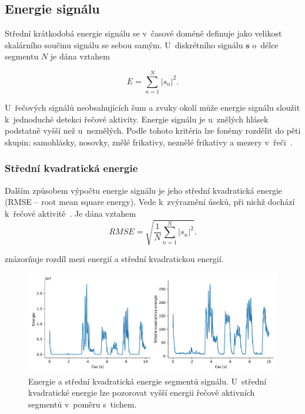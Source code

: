 \subsection{Energie signálu}
\label{subsection:Energy}
Střední krátkodobá energie signálu se v~časové doméně definuje jako velikost skalárního součinu signálu se sebou samým. U~diskrétního signálu $\mathbf{s}$ o~délce segmentu $N$ je dána vztahem

\begin{equation}
\label{eqn:Energy}
    E = \sum_{n=1}^{N} {\lvert s_{n} \rvert}^2.
\end{equation}

U~řečových signálů neobsahujících šum a zvuky okolí může energie signálu sloužit k~jednoduché detekci řečové aktivity. Energie signálu je u~znělých hlásek podstatně vyšší než u~neznělých. Podle tohoto kritéria lze fonémy rozdělit do pěti skupin: samohlásky, nosovky, znělé frikativy, neznělé frikativy a mezery v~řeči~\cite{Sigmund_Analyza}.

\subsubsection{Střední kvadratická energie}
\label{subsection:RMSE}
Dalším způsobem výpočtu energie signálu je jeho střední kvadratická energie (RMSE -- root mean square energy). Vede k~zvýraznění úseků, při nichž dochází k~řečové aktivitě~\cite{Simak_adaptive_energy_VAD}. Je dána vztahem
\begin{equation}
\label{eqn:RMSE}
    RMSE = \sqrt{\frac{1}{N} \sum_{n=1}^{N} {\lvert s_{n} \rvert}^2}.
\end{equation}

 znázorňuje rozdíl mezi energií a střední kvadratickou energií. 

\begin{figure}[ht]
  \centering
  \includegraphics[width=\linewidth]{obrazky-figures/energy.pdf}
  \caption{Energie a střední kvadratická energie segmentů signálu. U~střední kvadratické energie lze pozorovat vyšší energii řečově aktivních segmentů v~poměru s~tichem.}
  \label{fig:Energy}
\end{figure}


